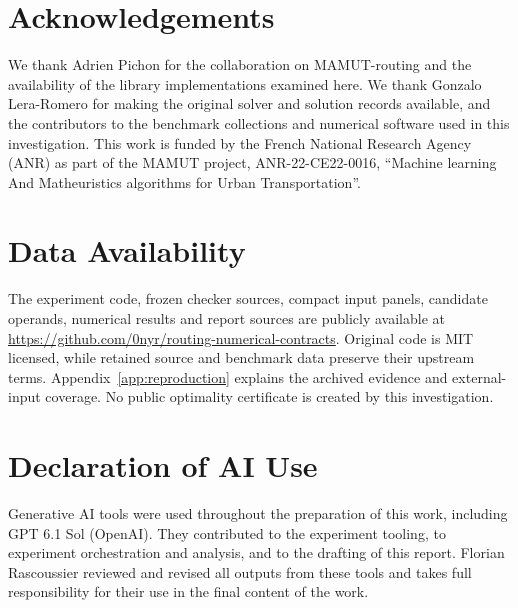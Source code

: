 \documentclass[11pt]{article}
\begin{document}
\section*{Acknowledgements}

We thank Adrien Pichon for the collaboration on MAMUT-routing and the availability of the library implementations examined here. We thank Gonzalo Lera-Romero for making the original solver and solution records available, and the contributors to the benchmark collections and numerical software used in this investigation. This work is funded by the French National Research Agency (ANR) as part of the MAMUT project, ANR-22-CE22-0016, \enquote{Machine learning And Matheuristics algorithms for Urban Transportation}.

\section*{Data Availability}

The experiment code, frozen checker sources, compact input panels, candidate operands, numerical results and report sources are publicly available at \url{https://github.com/0nyr/routing-numerical-contracts}. Original code is MIT licensed, while retained source and benchmark data preserve their upstream terms. Appendix~\ref{app:reproduction} explains the archived evidence and external-input coverage. No public optimality certificate is created by this investigation.

\section*{Declaration of AI Use}

Generative AI tools were used throughout the preparation of this work, including GPT 6.1 Sol (OpenAI). They contributed to the experiment tooling, to experiment orchestration and analysis, and to the drafting of this report. Florian Rascoussier reviewed and revised all outputs from these tools and takes full responsibility for their use in the final content of the work.

\printbibliography[heading=bibintoc]
\clearpage
\appendix


\end{document}
